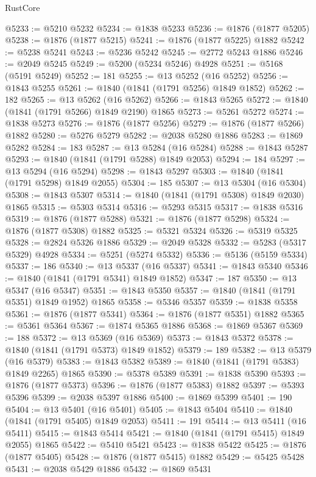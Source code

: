 \begin{lexlean}{RustCore}
\begin{coremodule}
@5233 := @5210 @5232
@5234 := @1838 @5233
@5236 := @1876 (@1877 @5205)
@5238 := @1876 (@1877 @5215)
@5241 := @1876 (@1877 @5225) @1882
@5242 := @5238 @5241
@5243 := @5236 @5242
@5245 := @2772 @5243 @1886
@5246 := @2049 @5245
@5249 := @5200 (@5234 @5246) @4928
@5251 := @5168 (@5191 @5249)
@5252 := 181
@5255 := @13 @5252 (@16 @5252)
@5256 := @1843 @5255
@5261 := @1840 (@1841 (@1791 @5256) @1849 @1852)
@5262 := 182
@5265 := @13 @5262 (@16 @5262)
@5266 := @1843 @5265
@5272 := @1840 (@1841 (@1791 @5266) @1849 @2190) @1865
@5273 := @5261 @5272
@5274 := @1838 @5273
@5276 := @1876 (@1877 @5256)
@5279 := @1876 (@1877 @5266) @1882
@5280 := @5276 @5279
@5282 := @2038 @5280 @1886
@5283 := @1869 @5282
@5284 := 183
@5287 := @13 @5284 (@16 @5284)
@5288 := @1843 @5287
@5293 := @1840 (@1841 (@1791 @5288) @1849 @2053)
@5294 := 184
@5297 := @13 @5294 (@16 @5294)
@5298 := @1843 @5297
@5303 := @1840 (@1841 (@1791 @5298) @1849 @2055)
@5304 := 185
@5307 := @13 @5304 (@16 @5304)
@5308 := @1843 @5307
@5314 := @1840 (@1841 (@1791 @5308) @1849 @2030) @1865
@5315 := @5303 @5314
@5316 := @5293 @5315
@5317 := @1838 @5316
@5319 := @1876 (@1877 @5288)
@5321 := @1876 (@1877 @5298)
@5324 := @1876 (@1877 @5308) @1882
@5325 := @5321 @5324
@5326 := @5319 @5325
@5328 := @2824 @5326 @1886
@5329 := @2049 @5328
@5332 := @5283 (@5317 @5329) @4928
@5334 := @5251 (@5274 @5332)
@5336 := @5136 (@5159 @5334)
@5337 := 186
@5340 := @13 @5337 (@16 @5337)
@5341 := @1843 @5340
@5346 := @1840 (@1841 (@1791 @5341) @1849 @1852)
@5347 := 187
@5350 := @13 @5347 (@16 @5347)
@5351 := @1843 @5350
@5357 := @1840 (@1841 (@1791 @5351) @1849 @1952) @1865
@5358 := @5346 @5357
@5359 := @1838 @5358
@5361 := @1876 (@1877 @5341)
@5364 := @1876 (@1877 @5351) @1882
@5365 := @5361 @5364
@5367 := @1874 @5365 @1886
@5368 := @1869 @5367
@5369 := 188
@5372 := @13 @5369 (@16 @5369)
@5373 := @1843 @5372
@5378 := @1840 (@1841 (@1791 @5373) @1849 @1852)
@5379 := 189
@5382 := @13 @5379 (@16 @5379)
@5383 := @1843 @5382
@5389 := @1840 (@1841 (@1791 @5383) @1849 @2265) @1865
@5390 := @5378 @5389
@5391 := @1838 @5390
@5393 := @1876 (@1877 @5373)
@5396 := @1876 (@1877 @5383) @1882
@5397 := @5393 @5396
@5399 := @2038 @5397 @1886
@5400 := @1869 @5399
@5401 := 190
@5404 := @13 @5401 (@16 @5401)
@5405 := @1843 @5404
@5410 := @1840 (@1841 (@1791 @5405) @1849 @2053)
@5411 := 191
@5414 := @13 @5411 (@16 @5411)
@5415 := @1843 @5414
@5421 := @1840 (@1841 (@1791 @5415) @1849 @2055) @1865
@5422 := @5410 @5421
@5423 := @1838 @5422
@5425 := @1876 (@1877 @5405)
@5428 := @1876 (@1877 @5415) @1882
@5429 := @5425 @5428
@5431 := @2038 @5429 @1886
@5432 := @1869 @5431

\end{coremodule}
\end{lexlean}
